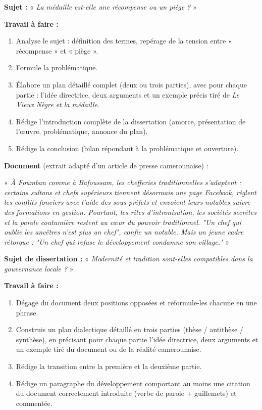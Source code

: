 \documentclass[11pt]{article}
\begin{document}
\begin{exercice}
\textbf{Sujet :} « \emph{La médaille est-elle une récompense ou un piège ?} »

\textbf{Travail à faire :}
\begin{enumerate}
\item Analyse le sujet : définition des termes, repérage de la tension entre « récompense » et « piège ».
\item Formule la problématique.
\item Élabore un plan détaillé complet (deux ou trois parties), avec pour chaque partie : l'idée directrice, deux arguments et un exemple précis tiré de \emph{Le Vieux Nègre et la médaille}.
\item Rédige l'introduction complète de la dissertation (amorce, présentation de l'œuvre, problématique, annonce du plan).
\item Rédige la conclusion (bilan répondant à la problématique et ouverture).
\end{enumerate}
\end{exercice}

\begin{exercice}
\textbf{Document} (extrait adapté d'un article de presse camerounaise) :

« \emph{À Foumban comme à Bafoussam, les chefferies traditionnelles s'adaptent : certains sultans et chefs supérieurs tiennent désormais une page Facebook, règlent les conflits fonciers avec l'aide des sous-préfets et envoient leurs notables suivre des formations en gestion. Pourtant, les rites d'intronisation, les sociétés secrètes et la parole coutumière restent au cœur du pouvoir traditionnel. "Un chef qui oublie les ancêtres n'est plus un chef", confie un notable. Mais un jeune cadre rétorque : "Un chef qui refuse le développement condamne son village."} »

\textbf{Sujet de dissertation :} « \emph{Modernité et tradition sont-elles compatibles dans la gouvernance locale ?} »

\textbf{Travail à faire :}
\begin{enumerate}
\item Dégage du document deux positions opposées et reformule-les chacune en une phrase.
\item Construis un plan dialectique détaillé en trois parties (thèse / antithèse / synthèse), en précisant pour chaque partie l'idée directrice, deux arguments et un exemple tiré du document ou de la réalité camerounaise.
\item Rédige la transition entre la première et la deuxième partie.
\item Rédige un paragraphe du développement comportant au moins une citation du document correctement introduite (verbe de parole + guillemets) et commentée.
\end{enumerate}
\end{exercice}
\end{document}
